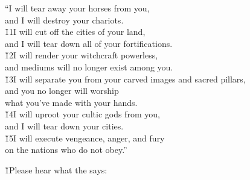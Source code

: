 \begin{poetry}
\poemll    ``I will tear away your horses from you, \\
\poemlll       and I will destroy your chariots. \\
\poeml \v{11}I will cut off the cities of your land, \\
\poemll    and I will tear down all of your fortifications. \\
\poeml \v{12}I will render your witchcraft powerless, \\
\poemll    and mediums will no longer exist among you. \\
\poeml \v{13}I will separate you from your carved images and sacred pillars, \\
\poemll    and you no longer will worship \\
\poemlll       what you've made with your hands. \\
\poeml \v{14}I will uproot your cultic gods from you, \\
\poemll    and I will tear down your cities. \\
\poeml \v{15}I will execute vengeance, anger, and fury \\
\poemll    on the nations who do not obey.''
\end{poetry}

\v{1}Please hear what the  says:

